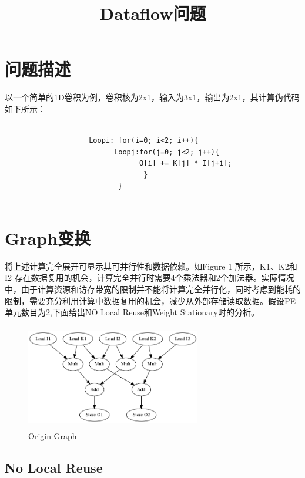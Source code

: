 \documentclass[UTF8]{scrartcl}
\title{Dataflow问题}
\author{}
\begin{document}
\maketitle


\section{问题描述}

以一个简单的1D卷积为例，卷积核为2x1，输入为3x1，输出为2x1，其计算伪代码如下所示：

\begin{lstlisting}

                    Loopi: for(i=0; i<2; i++){
                          Loopj:for(j=0; j<2; j++){
	                            O[i] += K[j] * I[j+i];
                                 }
                           }
                                     
\end{lstlisting}

\section{Graph变换}

	将上述计算完全展开可显示其可并行性和数据依赖。如Figure 1 所示，K1、K2和I2 存在数据复用的机会，计算完全并行时需要4个乘法器和2个加法器。实际情况中，由于计算资源和访存带宽的限制并不能将计算完全并行化，同时考虑到能耗的限制，需要充分利用计算中数据复用的机会，减少从外部存储读取数据。假设PE单元数目为2,下面给出NO Local Reuse和Weight Stationary时的分析。
	
			\begin{figure}[h]
				\centering
				\includegraphics[width=3.0in,height=1.8in]{ws.png} 
				\caption{Origin Graph}
				\label{fig1}
			\end{figure}

	\subsection{No Local Reuse}
	
\end{document}
